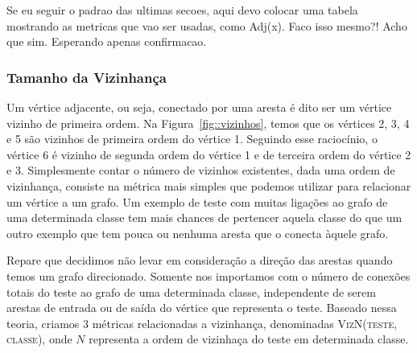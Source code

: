 Se eu seguir o padrao das ultimas secoes, aqui devo colocar uma tabela mostrando as metricas que vao ser usadas, como Adj(x). Faco isso mesmo?! Acho que sim. Esperando apenas confirmacao.





\subsubsection{Tamanho da Vizinhança}
\label{subsubsection::neighborhoodsize}

Um vértice adjacente, ou seja, conectado por uma aresta é dito ser um vértice vizinho de primeira ordem. Na Figura~\ref{fig::vizinhos}, temos que os vértices 2, 3, 4 e 5 são vizinhos de primeira ordem do vértice 1. Seguindo esse raciocínio, o vértice 6 é vizinho de segunda ordem do vértice 1 e de terceira ordem do vértice 2 e 3. 
Simplesmente contar o número de vizinhos existentes, dada uma ordem de vizinhança, consiste na métrica mais simples que podemos utilizar para relacionar um vértice a um grafo. Um exemplo de teste com muitas ligações ao grafo de uma determinada classe tem mais chances de pertencer aquela classe do que um outro exemplo que tem pouca ou nenhuma aresta que o conecta àquele grafo. 

Repare que decidimos não levar em consideração a direção das arestas quando temos um grafo direcionado. Somente nos importamos com o número de conexões totais do teste ao grafo de uma determinada classe, independente de serem arestas de entrada ou de saída do vértice que representa o teste. Baseado nessa teoria, criamos 3 métricas relacionadas a vizinhança, denominadas \textsc{VizN(teste, classe)}, onde $N$ representa a ordem de vizinhaça do teste em determinada classe.

